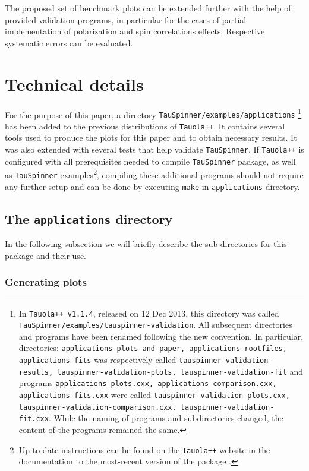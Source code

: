 \documentclass{article}
\begin{document}
The proposed set of benchmark plots can be extended further with 
the help of provided validation programs, in particular for the cases of
partial implementation of polarization and spin correlations effects. 
Respective 
systematic errors can be evaluated.  


\section{Technical details} \label{Sec:Installation}

For the purpose of this paper, a directory {\tt TauSpinner/examples/applications}%
\footnote{In {\tt Tauola++ v1.1.4}, released on 12 Dec 2013, this directory was called {\tt TauSpinner/examples/tauspinner-validation}.
All subsequent directories and programs have been renamed following the new convention. 
In particular, directories: {\tt applications-plots-and-paper, applications-rootfiles, applications-fits} was respectively 
called {\tt tauspinner-validation-results, tauspinner-validation-plots, tauspinner-validation-fit} and programs 
{\tt applications-plots.cxx, applications-comparison.cxx, applications-fits.cxx} were called 
{\tt tauspinner-validation-plots.cxx, tauspinner-validation-comparison.cxx, tauspinner-validation-fit.cxx}.
While the naming of programs and subdirectories changed, the content of the programs remained the same.}
has been added to the previous distributions of {\tt Tauola++}. It contains several tools used to produce the plots
for this paper and to obtain necessary results. It was also extended with several tests that help validate {\tt TauSpinner}.
If {\tt Tauola++} is configured with all prerequisites needed to compile {\tt TauSpinner} package,
as well as {\tt TauSpinner} examples\footnote{Up-to-date instructions can be found on the {\tt Tauola++} website in the documentation
to the most-recent version of the package \cite{tauolaC++}.},
compiling these additional programs should not require any further setup and can be done by executing {\tt make} in {\tt applications} directory.

\subsection{ The {\tt applications} directory}

In the following subsection we will briefly describe the sub-directories for this package and their use.

\subsubsection{Generating plots}
\end{document}
